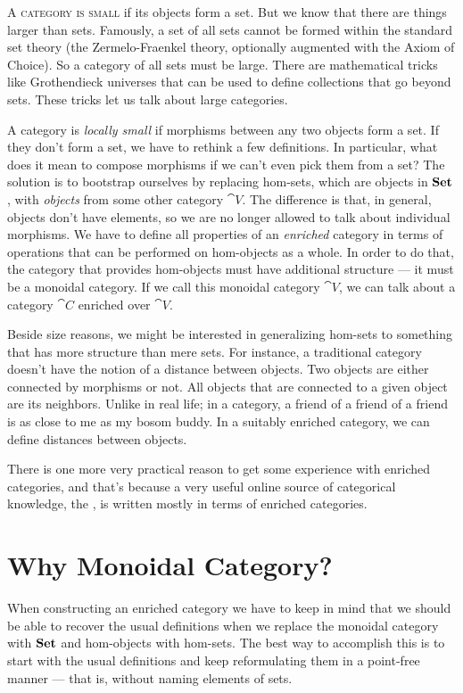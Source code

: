 \lettrine[lhang=0.17]{A}{ category is small} if its objects form a set. But we know that
there are things larger than sets. Famously, a set of all sets cannot be
formed within the standard set theory (the Zermelo-Fraenkel theory,
optionally augmented with the Axiom of Choice). So a category of all
sets must be large. There are mathematical tricks like Grothendieck
universes that can be used to define collections that go beyond sets.
These tricks let us talk about large categories.

A category is \emph{locally small} if morphisms between any two objects
form a set. If they don't form a set, we have to rethink a few
definitions. In particular, what does it mean to compose morphisms if we
can't even pick them from a set? The solution is to bootstrap ourselves
by replacing hom-sets, which are objects in $\mathbf{Set}$, with
\emph{objects} from some other category $\cat{V}$. The difference is
that, in general, objects don't have elements, so we are no longer
allowed to talk about individual morphisms. We have to define all
properties of an \emph{enriched} category in terms of operations that
can be performed on hom-objects as a whole. In order to do that, the
category that provides hom-objects must have additional structure --- it
must be a monoidal category. If we call this monoidal category $\cat{V}$,
we can talk about a category $\cat{C}$ enriched over $\cat{V}$.

Beside size reasons, we might be interested in generalizing hom-sets to
something that has more structure than mere sets. For instance, a
traditional category doesn't have the notion of a distance between
objects. Two objects are either connected by morphisms or not. All
objects that are connected to a given object are its neighbors. Unlike
in real life; in a category, a friend of a friend of a friend is as
close to me as my bosom buddy. In a suitably enriched category, we can
define distances between objects.

There is one more very practical reason to get some experience with
enriched categories, and that's because a very useful online source of
categorical knowledge, the , is written
mostly in terms of enriched categories.

\section{Why Monoidal Category?}

When constructing an enriched category we have to keep in mind that we
should be able to recover the usual definitions when we replace the
monoidal category with $\mathbf{Set}$ and hom-objects with hom-sets. The
best way to accomplish this is to start with the usual definitions and
keep reformulating them in a point-free manner --- that is, without
naming elements of sets.

